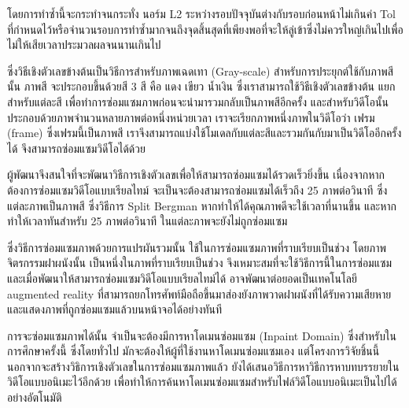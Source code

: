\documentclass[hidelinks,a4paper,14pt]{article}
\numberwithin{equation}{section}							%
\begin{document}
{		
		
		โดยการทำซ้ำนี้จะกระทำจนกระทั่ง นอร์ม L2 ระหว่างรอบปัจจุบันต่างกับรอบก่อนหน้าไม่เกินค่า Tol ที่กำหนดไว้หรือจำนวนรอบการทำซ้ำมากจนถึงจุดสิ้นสุดที่เพียงพอที่จะให้ลู่เข้าซึ่งไม่ควรใหญ่เกินไปเพื่อไม่ให้เสียเวลาประมวลผลจนนานเกินไป 
	
		
		
		ซึ่งวิธีเชิงตัวเลขข้างต้นเป็นวิธีการสำหรับภาพเฉดเทา (Gray-scale) สำหรับการประยุกต์ใช้กับภาพสีนั้น ภาพสี จะประกอบขึ้นด้วยสี  3 สี คือ แดง เขียว น้ำเงิน ซึ่งเราสามารถใช้วิธีเชิงตัวเลขข้างต้น แยกสำหรับแต่ละสี เพื่อทำการซ่อมแซมภาพก่อนจะนำมารวมกลับเป็นภาพสีอีกครั้ง และสำหรับวิดีโอนั้นประกอบด้วยภาพจำนวนหลายภาพต่อหนึ่งหน่วยเวลา เราจะเรียกภาพหนึ่งภาพในวิดีโอว่า เฟรม (frame) ซึ่งเฟรมนี้เป็นภาพสี เราจึงสามารถแบ่งใช้โมเดลกับแต่ละสีและรวมกันกับมาเป็นวิดีโออีกครั้งได้ จึงสามารถซ่อมแซมวิดีโอได้ด้วย
	
		
		ผู้พัฒนาจึงสนใจที่จะพัฒนาวิธีการเชิงตัวเลขเพื่อให้สามารถซ่อมแซมได้รวดเร็วยิ่งขึ้น เนื่องจากหากต้องการซ่อมแซมวิดีโอแบบเรียลไทม์ จะเป็นจะต้องสามารถซ่อมแซมได้เร็วถึง 25 ภาพต่อวินาที ซึ่งแต่ละภาพเป็นภาพสี ซึ่งวิธีการ Split Bergman หากทำให้ได้คุณภาพดีจะใช้เวลาที่นานขึ้น และหากทำให้เวลาทันสำหรับ 25 ภาพต่อวินาที ในแต่ละภาพจะยังไม่ถูกซ่อมแซม
		
		
		
		ซึ่งวิธีการซ่อมแซมภาพด้วยการแปรผันรวมนั้น ใช้ในการซ่อมแซมภาพที่ราบเรียบเป็นช่วง โดยภาพจิตรกรรมฝาผนังนั้น เป็นหนึ่งในภาพที่ราบเรียบเป็นช่วง จึงเหมาะสมที่จะใช้วิธีการนี้ในการซ่อมแซม และเมื่อพัฒนาให้สามารถซ่อมแซมวิดีโอแบบเรียลไทม์ได้ อาจพัฒนาต่อยอดเป็นเทคโนโลยี augmented reality ที่สามารถยกโทรศัพท์มือถือขึ้นมาส่องยังภาพวาดฝาผนังที่ได้รับความเสียหายและแสดงภาพที่ถูกซ่อมแซมแล้วบนหน้าจอได้อย่างทันที
		
		
		การจะซ่อมแซมภาพได้นั้น จำเป็นจะต้องมีการหาโดเมนซ่อมแซม (Inpaint Domain) ซึ่งสำหรับในการศึกษาครั้งนี้ ซึ่งโดยทั่วไป มักจะต้องให้ผู้ที่ใช้งานหาโดเมนซ่อมแซมเอง แต่โครงการวิจัยชิ้นนี้นอกจากจะสร้างวิธิการเชิงตัวเลขในการซ่อมแซมภาพแล้ว ยังได้เสนอวิธีการหาวิธีการหาบทบรรยายในวิดีโอแบบอนิเมะไว้อีกด้วย เพื่อทำให้การค้นหาโดเมนซ่อมแซมสำหรับไฟล์วิดีโอแบบอนิเมะเป็นไปได้อย่างอัตโนมัติ
		
}
\end{document}
